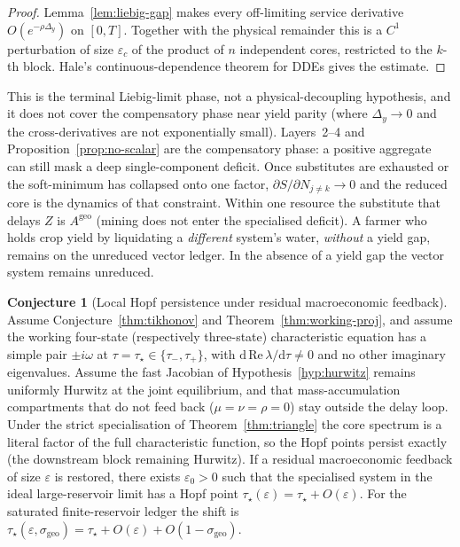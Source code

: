 \documentclass[11pt]{article}
\theoremstyle{definition}
\newtheorem{conjecture}{Conjecture}
\begin{document}
\begin{proof}
Lemma~\ref{lem:liebig-gap} makes every off-limiting service derivative $O(e^{-\rho\Delta_y})$ on $[0,T]$. Together with the physical remainder this is a $C^1$ perturbation of size $\varepsilon_c$ of the product of $n$ independent cores, restricted to the $k$-th block. Hale's continuous-dependence theorem for DDEs \cite{hale1993} gives the estimate.
\end{proof}

This is the terminal Liebig-limit phase, not a physical-decoupling hypothesis, and it does not cover the compensatory phase near yield parity (where $\Delta_y\to 0$ and the cross-derivatives are not exponentially small). Layers~2--4 and Proposition~\ref{prop:no-scalar} are the compensatory phase: a positive aggregate can still mask a deep single-component deficit. Once substitutes are exhausted or the soft-minimum has collapsed onto one factor, $\partial S/\partial N_{j\neq k}\to 0$ and the reduced core is the dynamics of that constraint. Within one resource the substitute that delays $Z$ is $A^{\mathrm{geo}}$ (mining does not enter the specialised deficit). A farmer who holds crop yield by liquidating a \emph{different} system's water, \emph{without} a yield gap, remains on the unreduced vector ledger. In the absence of a yield gap the vector system remains unreduced.

\begin{conjecture}[Local Hopf persistence under residual macroeconomic feedback]
\label{thm:hopf-persist}
Assume Conjecture~\ref{thm:tikhonov} and Theorem~\ref{thm:working-proj}, and assume the working four-state (respectively three-state) characteristic equation has a simple pair $\pm i\omega$ at $\tau=\tau_\star\in\{\tau_-,\tau_+\}$, with $\mathrm{d}\,\mathrm{Re}\,\lambda/\mathrm{d}\tau\neq 0$ and no other imaginary eigenvalues. Assume the fast Jacobian of Hypothesis~\ref{hyp:hurwitz} remains uniformly Hurwitz at the joint equilibrium, and that mass-accumulation compartments that do not feed back ($\mu=\nu=\rho=0$) stay outside the delay loop. Under the strict specialisation of Theorem~\ref{thm:triangle} the core spectrum is a literal factor of the full characteristic function, so the Hopf points persist exactly (the downstream block remaining Hurwitz). If a residual macroeconomic feedback of size $\varepsilon$ is restored, there exists $\varepsilon_0>0$ such that the specialised system in the ideal large-reservoir limit has a Hopf point $\tau_\star(\varepsilon)=\tau_\star+O(\varepsilon)$. For the saturated finite-reservoir ledger the shift is $\tau_\star(\varepsilon,\sigma_{\mathrm{geo}})=\tau_\star+O(\varepsilon)+O(1-\sigma_{\mathrm{geo}})$.
\end{conjecture}
\end{document}
